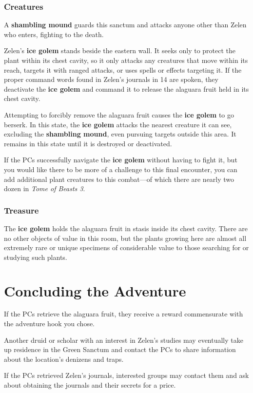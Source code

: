 \documentclass[10pt,a4paper,twoside,bg=print,twocolumn,openany,nodeprecatedcode]{dndbook}
\begin{document}
\subsubsection{Creatures}
A \textbf{shambling mound} guards this sanctum and attacks anyone other than Zelen who enters, fighting to the death.

Zelen's \textbf{ice golem} stands beside the eastern wall. It seeks only to protect the plant within its chest cavity, so it only attacks any creatures that move within its reach, targets it with ranged attacks, or uses spells or effects targeting it. If the proper command words found in Zelen's journals in 14 are spoken, they deactivate the \textbf{ice golem} and command it to release the alaguara fruit held in its chest cavity.

Attempting to forcibly remove the alaguara fruit causes the \textbf{ice golem} to go berserk. In this state, the \textbf{ice golem} attacks the nearest creature it can see, excluding the \textbf{shambling mound}, even pursuing targets outside this area. It remains in this state until it is destroyed or deactivated.

If the PCs successfully navigate the \textbf{ice golem} without having to fight it, but you would like there to be more of a challenge to this final encounter, you can add additional plant creatures to this combat—of which there are nearly two dozen in \textit{Tome of Beasts 3}.

\subsubsection{Treasure}
The \textbf{ice golem} holds the alaguara fruit in stasis inside its chest cavity. There are no other objects of value in this room, but the plants growing here are almost all extremely rare or unique specimens of considerable value to those searching for or studying such plants.

\section{Concluding the Adventure}
If the PCs retrieve the alaguara fruit, they receive a reward commensurate with the adventure hook you chose.

Another druid or scholar with an interest in Zelen's studies may eventually take up residence in the Green Sanctum and contact the PCs to share information about the location's denizens and traps.

If the PCs retrieved Zelen's journals, interested groups may contact them and ask about obtaining the journals and their secrets for a price.
\end{document}
